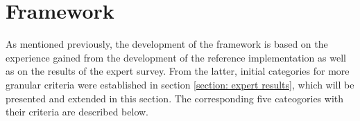 	\section{Framework}
	
    As mentioned previously, the development of the framework is based on the experience gained from the development of the reference implementation as well as on the results of the expert survey. From the latter, initial categories for more granular criteria were established in section \ref{section: expert results}, which will be presented and extended in this section. The corresponding five cateogories with their criteria are described below.
    
